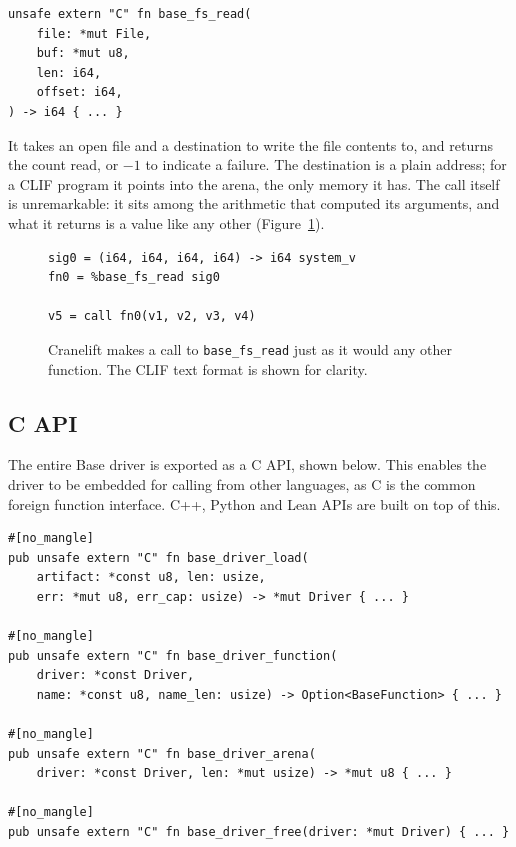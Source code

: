 \documentclass[11pt]{article}
\newenvironment{codeblock}
  {\par\noindent\begin{minipage}{\linewidth}}
  {\end{minipage}\par\noindent}
\begin{document}
\begin{codeblock}
\begin{lstlisting}[style=code,morekeywords={unsafe,extern,fn}]
unsafe extern "C" fn base_fs_read(
    file: *mut File,
    buf: *mut u8,
    len: i64,
    offset: i64,
) -> i64 { ... }
\end{lstlisting}
\end{codeblock}

It takes an open file and a destination to write the file contents to,
and returns the count read, or $-1$ to indicate a failure. The destination is a
plain address; for a CLIF program it points into the arena, the only memory
it has. The call itself is unremarkable: it sits among the arithmetic that
computed its arguments, and what it returns is a value like any other
(Figure~\ref{fig:cliftext}).

\begin{figure}[tb]
\centering
\begin{codeblock}
\begin{lstlisting}[style=code]
sig0 = (i64, i64, i64, i64) -> i64 system_v
fn0 = %base_fs_read sig0

v5 = call fn0(v1, v2, v3, v4)
\end{lstlisting}
\end{codeblock}
\caption{Cranelift makes a call to \texttt{base\_fs\_read} just as it
would any other function. The CLIF text format is shown for clarity.}
\label{fig:cliftext}
\end{figure}

\subsection{C API}

The entire Base driver is exported as a C API, shown below. This
enables the driver to be embedded for calling from other languages, as C is the
common foreign function interface. C++, Python and Lean APIs are built on top
of this.

\begin{codeblock}
\begin{lstlisting}[style=code,morekeywords={pub,unsafe,extern,fn,no_mangle}]
#[no_mangle]
pub unsafe extern "C" fn base_driver_load(
    artifact: *const u8, len: usize,
    err: *mut u8, err_cap: usize) -> *mut Driver { ... }

#[no_mangle]
pub unsafe extern "C" fn base_driver_function(
    driver: *const Driver,
    name: *const u8, name_len: usize) -> Option<BaseFunction> { ... }

#[no_mangle]
pub unsafe extern "C" fn base_driver_arena(
    driver: *const Driver, len: *mut usize) -> *mut u8 { ... }

#[no_mangle]
pub unsafe extern "C" fn base_driver_free(driver: *mut Driver) { ... }
\end{lstlisting}
\end{codeblock}
\end{document}
